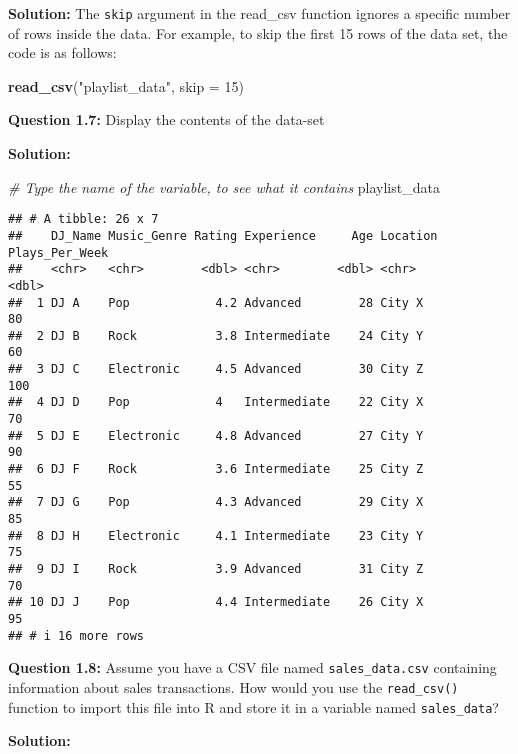 \documentclass[
]{article}
\newenvironment{Shaded}{\begin{snugshade}}{\end{snugshade}}
\newcommand{\AttributeTok}[1]{\textcolor[rgb]{0.13,0.29,0.53}{#1}}
\newcommand{\CommentTok}[1]{\textcolor[rgb]{0.56,0.35,0.01}{\textit{#1}}}
\newcommand{\DecValTok}[1]{\textcolor[rgb]{0.00,0.00,0.81}{#1}}
\newcommand{\FunctionTok}[1]{\textcolor[rgb]{0.13,0.29,0.53}{\textbf{#1}}}
\newcommand{\NormalTok}[1]{#1}
\newcommand{\StringTok}[1]{\textcolor[rgb]{0.31,0.60,0.02}{#1}}
\begin{document}
\textbf{Solution:} The \texttt{skip} argument in the read\_csv function
ignores a specific number of rows inside the data. For example, to skip
the first 15 rows of the data set, the code is as follows:

\begin{Shaded}
\begin{Highlighting}[]
\FunctionTok{read\_csv}\NormalTok{(}\StringTok{"playlist\_data"}\NormalTok{, }\AttributeTok{skip =} \DecValTok{15}\NormalTok{) }
\end{Highlighting}
\end{Shaded}

\textbf{Question 1.7:} Display the contents of the data-set

\textbf{Solution:}

\begin{Shaded}
\begin{Highlighting}[]
\CommentTok{\# Type the name of the variable, to see what it contains}
\NormalTok{playlist\_data}
\end{Highlighting}
\end{Shaded}

\begin{verbatim}
## # A tibble: 26 x 7
##    DJ_Name Music_Genre Rating Experience     Age Location Plays_Per_Week
##    <chr>   <chr>        <dbl> <chr>        <dbl> <chr>             <dbl>
##  1 DJ A    Pop            4.2 Advanced        28 City X               80
##  2 DJ B    Rock           3.8 Intermediate    24 City Y               60
##  3 DJ C    Electronic     4.5 Advanced        30 City Z              100
##  4 DJ D    Pop            4   Intermediate    22 City X               70
##  5 DJ E    Electronic     4.8 Advanced        27 City Y               90
##  6 DJ F    Rock           3.6 Intermediate    25 City Z               55
##  7 DJ G    Pop            4.3 Advanced        29 City X               85
##  8 DJ H    Electronic     4.1 Intermediate    23 City Y               75
##  9 DJ I    Rock           3.9 Advanced        31 City Z               70
## 10 DJ J    Pop            4.4 Intermediate    26 City X               95
## # i 16 more rows
\end{verbatim}

\textbf{Question 1.8:} Assume you have a CSV file named
\texttt{sales\_data.csv} containing information about sales
transactions. How would you use the \texttt{read\_csv()} function to
import this file into R and store it in a variable named
\texttt{sales\_data}?

\textbf{Solution:}
\end{document}
